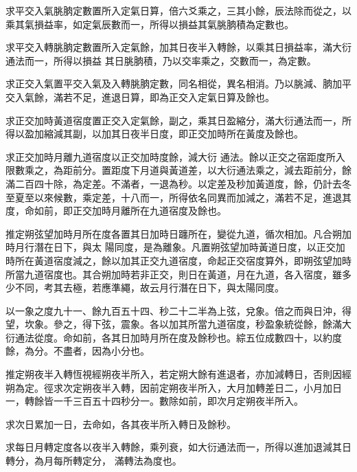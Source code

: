 \begin{pinyinscope}
 求平交入氣朓朒定數置所入定氣日算，倍六爻乘之，三其小餘，辰法除而從之，以乘其氣損益率，如定氣辰數而一，所得以損益其氣朓朒積為定數也。



 求平交入轉朓朒定數置所入定氣餘，加其日夜半入轉餘，以乘其日損益率，滿大衍通法而一，所得以損益
 其日朓朒積，乃以交率乘之，交數而一，為定數。



 求正交入氣置平交入氣及入轉朓朒定數，同名相從，異名相消。乃以朓減、朒加平交入氣餘，滿若不足，進退日算，即為正交入定氣日算及餘也。



 求正交加時黃道宿度置正交入定氣餘，副之，乘其日盈縮分，滿大衍通法而一，所得以盈加縮減其副，以加其日夜半日度，即正交加時所在黃度及餘也。



 求正交加時月離九道宿度以正交加時度餘，減大衍
 通法。餘以正交之宿距度所入限數乘之，為距前分。置距度下月道與黃道差，以大衍通法乘之，減去距前分，餘滿二百四十除，為定差。不滿者，一退為秒。以定差及秒加黃道度，餘，仍計去冬至夏至以來候數，乘定差，十八而一，所得依名同異而加減之，滿若不足，進退其度，命如前，即正交加時月離所在九道宿度及餘也。



 推定朔弦望加時月所在度各置其日加時日躔所在，變從九道，循次相加。凡合朔加時月行潛在日下，與太
 陽同度，是為離象。凡置朔弦望加時黃道日度，以正交加時所在黃道宿度減之，餘以加其正交九道宿度，命起正交宿度算外，即朔弦望加時所當九道宿度也。其合朔加時若非正交，則日在黃道，月在九道，各入宿度，雖多少不同，考其去極，若應準繩，故云月行潛在日下，與太陽同度。



 以一象之度九十一、餘九百五十四、秒二十二半為上弦，兌象。倍之而與日沖，得望，坎象。參之，得下弦，震象。各以加其所當九道宿度，秒盈象統從餘，餘滿大衍通法從度。命如前，各其日加時月所在度及餘秒也。綜五位成數四十，以約度餘，為分。不盡者，因為小分也。



 推定朔夜半入轉恆視經朔夜半所入，若定朔大餘有進退者，亦加減轉日，否則因經朔為定。徑求次定朔夜半入轉，因前定朔夜半所入，大月加轉差日二，小月加日一，轉餘皆一千三百五十四秒分一。數除如前，即次月定朔夜半所入。



 求次日累加一日，去命如，各其夜半所入轉日及餘秒。



 求每日月轉定度各以夜半入轉餘，乘列衰，如大衍通法而一，所得以進加退減其日轉分，為月每所轉定分，
 滿轉法為度也。




\end{pinyinscope}
